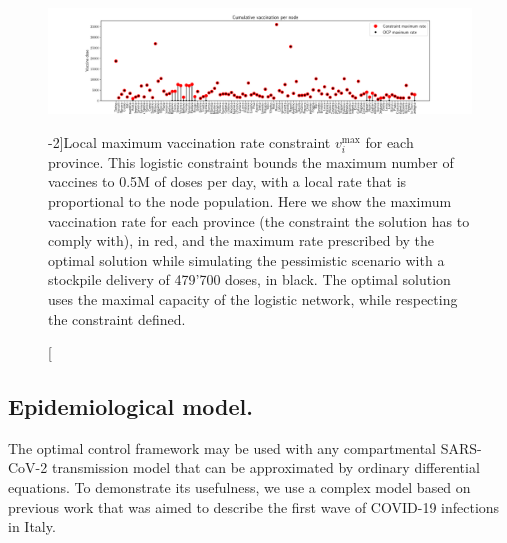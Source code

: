 \begin{figure}[!ht]
    \centering
    \includegraphics{fig_italy-ocp/figuresSI/SI_constraint_dist.pdf}
    \caption[Vizualisation of the local maximum vaccination rate constraint][-2\baselineskip]{Local maximum vaccination rate constraint $v_i^\mathrm{max}$ for each province. This logistic constraint bounds the maximum number of vaccines to 0.5M of doses per day, with a local rate that is proportional to the node population. Here we show the maximum vaccination rate for each province (the constraint the solution has to comply with), in red, and the maximum rate prescribed by the optimal solution while simulating the pessimistic scenario with a stockpile delivery of 479'700 doses, in black. The optimal solution uses the maximal capacity of the logistic network, while respecting the constraint defined.}
    \label{fig:OC_logistic_constraints}
\end{figure}


\subsection{Epidemiological model.} 
The optimal control framework may be used with any compartmental SARS-CoV-2 transmission model that can be approximated by ordinary differential equations. To demonstrate its usefulness, we use a complex model based on previous work that was aimed to describe the first wave of COVID-19 infections in Italy\parencite{Gatto:SpreadDynamicsCOVID19:2020,Bertuzzo:GeographyCOVID19Spread:2020}. 

